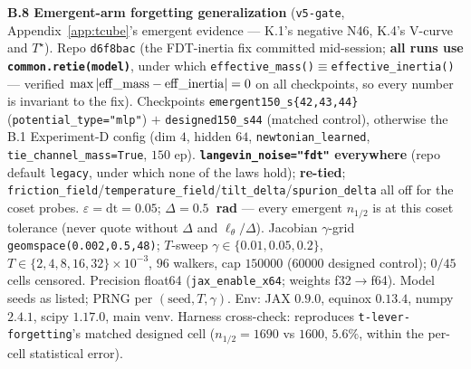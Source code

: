 \documentclass[10pt]{article}
\begin{document}
\medskip
\textbf{B.8 Emergent-arm forgetting generalization} (\texttt{v5-gate}, Appendix~\ref{app:tcube}'s emergent evidence --- K.1's negative N46, K.4's V-curve and $T^\star$). Repo \texttt{d6f8bac} (the FDT-inertia fix committed mid-session; \textbf{all runs use \texttt{common.retie(model)}}, under which \texttt{effective\_mass()}$\equiv$\texttt{effective\_inertia()} --- verified $\max|{\rm eff\_mass}-{\rm eff\_inertia}|=0$ on all checkpoints, so every number is invariant to the fix). Checkpoints \texttt{emergent150\_s\{42,43,44\}} (\texttt{potential\_type="mlp"}) $+$ \texttt{designed150\_s44} (matched control), otherwise the B.1 Experiment-D config (dim $4$, hidden $64$, \texttt{newtonian\_learned}, \texttt{tie\_channel\_mass=True}, $150$ ep). \textbf{\texttt{langevin\_noise="fdt"} everywhere} (repo default \texttt{legacy}, under which none of the laws hold); \textbf{re-tied}; \texttt{friction\_field}/\texttt{temperature\_field}/\texttt{tilt\_delta}/\texttt{spurion\_delta} all off for the coset probes. $\varepsilon=\mathrm{dt}=0.05$; \textbf{$\Delta=0.5$~rad} --- every emergent $n_{1/2}$ is at this coset tolerance (never quote without $\Delta$ and $\ell_\theta/\Delta$). Jacobian $\gamma$-grid \texttt{geomspace(0.002,0.5,48)}; $T$-sweep $\gamma\in\{0.01,0.05,0.2\}$, $T\in\{2,4,8,16,32\}{\times}10^{-3}$, $96$ walkers, cap $150000$ ($60000$ designed control); $0/45$ cells censored. Precision float64 (\texttt{jax\_enable\_x64}; weights f32$\to$f64). Model seeds as listed; PRNG per $(\text{seed},T,\gamma)$. Env: JAX $0.9.0$, equinox $0.13.4$, numpy $2.4.1$, scipy $1.17.0$, main venv. Harness cross-check: reproduces \texttt{t-lever-forgetting}'s matched designed cell ($n_{1/2}=1690$ vs $1600$, $5.6\%$, within the per-cell statistical error).
\end{document}
